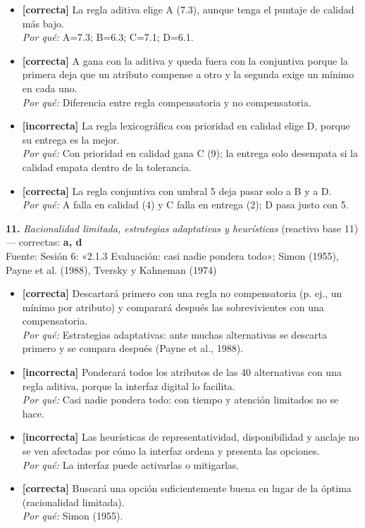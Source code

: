 \documentclass[10pt,letterpaper]{article}
\begin{document}
\begin{itemize}[leftmargin=1.2em,itemsep=0pt,topsep=1pt,parsep=0pt]
\item[\textbf{a)}] {\footnotesize \textbf{[correcta]} La regla aditiva elige A (7.3), aunque tenga el puntaje de calidad más bajo.\\ \textit{Por qué:} A=7.3; B=6.3; C=7.1; D=6.1.}
\item[\textbf{b)}] {\footnotesize \textbf{[correcta]} A gana con la aditiva y queda fuera con la conjuntiva porque la primera deja que un atributo compense a otro y la segunda exige un mínimo en cada uno.\\ \textit{Por qué:} Diferencia entre regla compensatoria y no compensatoria.}
\item[\textbf{c)}] {\footnotesize \textbf{[incorrecta]} La regla lexicográfica con prioridad en calidad elige D, porque su entrega es la mejor.\\ \textit{Por qué:} Con prioridad en calidad gana C (9); la entrega solo desempata si la calidad empata dentro de la tolerancia.}
\item[\textbf{d)}] {\footnotesize \textbf{[correcta]} La regla conjuntiva con umbral 5 deja pasar solo a B y a D.\\ \textit{Por qué:} A falla en calidad (4) y C falla en entrega (2); D pasa justo con 5.}
\end{itemize}
\vspace{3pt}\noindent\textbf{11.} \textit{Racionalidad limitada, estrategias adaptativas y heurísticas} (reactivo base 11) — correctas: \textbf{a, d}\\[-1pt]
{\scriptsize Fuente: Sesión 6: «2.1.3 Evaluación: casi nadie pondera todo»; Simon (1955), Payne et al. (1988), Tversky y Kahneman (1974)}
\begin{itemize}[leftmargin=1.2em,itemsep=0pt,topsep=1pt,parsep=0pt]
\item[\textbf{a)}] {\footnotesize \textbf{[correcta]} Descartará primero con una regla no compensatoria (p. ej., un mínimo por atributo) y comparará después las sobrevivientes con una compensatoria.\\ \textit{Por qué:} Estrategias adaptativas: ante muchas alternativas se descarta primero y se compara después (Payne et al., 1988).}
\item[\textbf{b)}] {\footnotesize \textbf{[incorrecta]} Ponderará todos los atributos de las 40 alternativas con una regla aditiva, porque la interfaz digital lo facilita.\\ \textit{Por qué:} Casi nadie pondera todo: con tiempo y atención limitados no se hace.}
\item[\textbf{c)}] {\footnotesize \textbf{[incorrecta]} Las heurísticas de representatividad, disponibilidad y anclaje no se ven afectadas por cómo la interfaz ordena y presenta las opciones.\\ \textit{Por qué:} La interfaz puede activarlas o mitigarlas.}
\item[\textbf{d)}] {\footnotesize \textbf{[correcta]} Buscará una opción suficientemente buena en lugar de la óptima (racionalidad limitada).\\ \textit{Por qué:} Simon (1955).}
\end{itemize}
\end{document}
